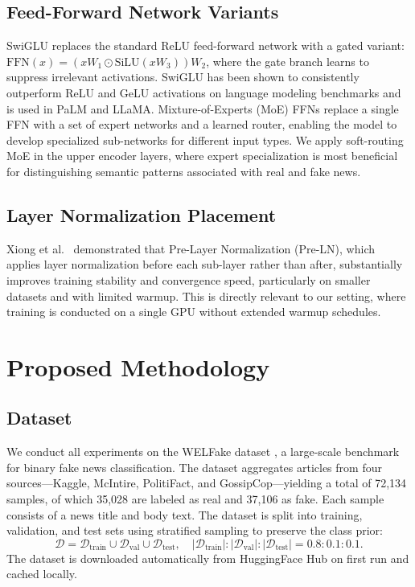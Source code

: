 \documentclass[conference]{IEEEtran}
\begin{document}
\subsection{Feed-Forward Network Variants}

SwiGLU \cite{shazeer2020glu} replaces the standard ReLU feed-forward network with a gated variant: $\text{FFN}(x) = (xW_1 \odot \text{SiLU}(xW_3))W_2$, where the gate branch learns to suppress irrelevant activations. SwiGLU has been shown to consistently outperform ReLU and GeLU activations on language modeling benchmarks and is used in PaLM and LLaMA. Mixture-of-Experts (MoE) FFNs \cite{fedus2022switch} replace a single FFN with a set of expert networks and a learned router, enabling the model to develop specialized sub-networks for different input types. We apply soft-routing MoE in the upper encoder layers, where expert specialization is most beneficial for distinguishing semantic patterns associated with real and fake news.

\subsection{Layer Normalization Placement}

Xiong et al.\ \cite{xiong2020layer} demonstrated that Pre-Layer Normalization (Pre-LN), which applies layer normalization before each sub-layer rather than after, substantially improves training stability and convergence speed, particularly on smaller datasets and with limited warmup. This is directly relevant to our setting, where training is conducted on a single GPU without extended warmup schedules.

\section{Proposed Methodology}
\label{sec:method}

\subsection{Dataset}

We conduct all experiments on the WELFake dataset \cite{verma2021welfake}, a large-scale benchmark for binary fake news classification. The dataset aggregates articles from four sources---Kaggle, McIntire, PolitiFact, and GossipCop---yielding a total of 72,134 samples, of which 35,028 are labeled as real and 37,106 as fake. Each sample consists of a news title and body text. The dataset is split into training, validation, and test sets using stratified sampling to preserve the class prior:
\[
\mathcal{D} = \mathcal{D}_{\text{train}} \cup \mathcal{D}_{\text{val}} \cup \mathcal{D}_{\text{test}}, \quad |\mathcal{D}_{\text{train}}| : |\mathcal{D}_{\text{val}}| : |\mathcal{D}_{\text{test}}| = 0.8 : 0.1 : 0.1.
\]
The dataset is downloaded automatically from HuggingFace Hub on first run and cached locally.
\end{document}
